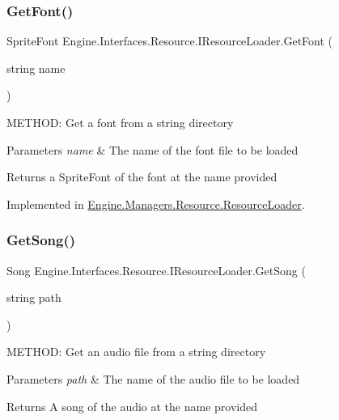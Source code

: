 \subsubsection{\texorpdfstring{Get\+Font()}{GetFont()}}
{\footnotesize\ttfamily Sprite\+Font Engine.\+Interfaces.\+Resource.\+I\+Resource\+Loader.\+Get\+Font (\begin{DoxyParamCaption}\item[{string}]{name }\end{DoxyParamCaption})}



M\+E\+T\+H\+OD\+: Get a font from a string directory 


\begin{DoxyParams}{Parameters}
{\em name} & The name of the font file to be loaded\\
\hline
\end{DoxyParams}
\begin{DoxyReturn}{Returns}
a Sprite\+Font of the font at the name provided
\end{DoxyReturn}


Implemented in \hyperlink{a00530_a160f06963928da598da9f9431ba65f73}{Engine.\+Managers.\+Resource.\+Resource\+Loader}.

\mbox{\label{a00462_a6d962a64dc4f377bdb417598b17c53d0}} 
\subsubsection{\texorpdfstring{Get\+Song()}{GetSong()}}
{\footnotesize\ttfamily Song Engine.\+Interfaces.\+Resource.\+I\+Resource\+Loader.\+Get\+Song (\begin{DoxyParamCaption}\item[{string}]{path }\end{DoxyParamCaption})}



M\+E\+T\+H\+OD\+: Get an audio file from a string directory 


\begin{DoxyParams}{Parameters}
{\em path} & The name of the audio file to be loaded\\
\hline
\end{DoxyParams}
\begin{DoxyReturn}{Returns}
A song of the audio at the name provided
\end{DoxyReturn}


